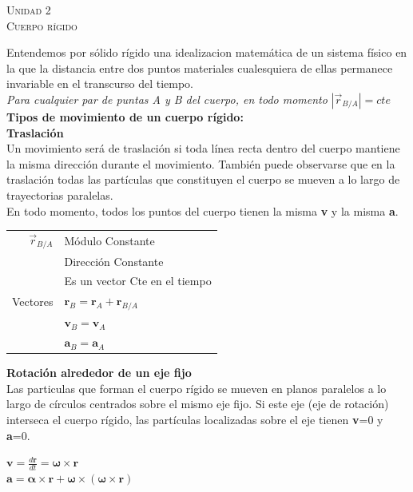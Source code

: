 \documentclass[11pt,a4paper,twocolumn]{article}
\newcommand{\unidad}[2]{\begin{center}
		\fontsize{10}{10}\selectfont\color{gray!50!black}\scshape Unidad #1 \\
		\fontsize{14}{14}\selectfont \scshape #2
		
\end{center}}
\newcommand{\vc}[1]{\textbf{#1}}
\newcommand{\vcs}[1]{\boldsymbol{#1}}
\begin{document}
	\newpage
	
	\unidad{2}{Cuerpo rígido}
	Entendemos por sólido rígido una idealizacion matemática de un sistema físico en la que la distancia entre dos puntos materiales cualesquiera de ellas permanece invariable en el transcurso del tiempo.\\
	\textit{Para cualquier par de puntas A y B del cuerpo, en todo momento} $|\overrightarrow{r}_{B/A}|=cte$\\

	
	\textbf{Tipos de movimiento de un cuerpo rígido:}\\
	
	\textbf{Traslación}\\
	Un movimiento será de traslación si toda línea recta dentro del cuerpo mantiene la misma dirección durante el movimiento. También puede observarse que en la traslación todas las partículas que constituyen el cuerpo se mueven a lo largo de trayectorias paralelas.\\
	En todo momento, todos los puntos del cuerpo tienen la misma \textbf{v} y la misma \textbf{a}.\\
	\begin{center}
		\begin{tabular}{r|l}
		$\overrightarrow{r}_{B/A}$&Módulo Constante\\
		&Dirección Constante\\\vspace{0.4cm}
		&Es un vector Cte en el tiempo\\
		Vectores&$\textbf{r}_{B}=\textbf{r}_{A}+\textbf{r}_{B/A}$\\
		& $\textbf{v}_{B}=\textbf{v}_{A}$\\ \vspace{0.4cm}
		&$\textbf{a}_{B}=\textbf{a}_{A}$\\
	\end{tabular}		
	\end{center}




	\textbf{Rotación alrededor de un eje fijo}\\
	Las particulas que forman el cuerpo rígido se mueven en planos paralelos a lo largo de círculos centrados sobre el mismo eje fijo. Si este eje (eje de rotación) interseca el cuerpo rígido, las partículas localizadas sobre el eje tienen \textbf{v}=0 y \textbf{a}=0.
	
	\begin{center}
		$\vc{v}=\frac{d\vc{r}}{dt}=\vcs{\omega} \times \vc{r}$\\
		$\vc{a}=\vcs{\alpha} \times\vc{r}+\vcs{\omega}\times(\vcs{\omega}\times \vc{r})$
	\end{center}
\end{document}
